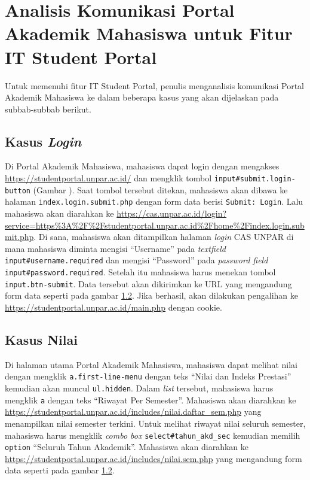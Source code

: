 \section{Analisis Komunikasi Portal Akademik Mahasiswa untuk Fitur IT Student Portal}
Untuk memenuhi fitur IT Student Portal, penulis menganalisis komunikasi Portal Akademik Mahasiswa ke dalam beberapa kasus yang akan dijelaskan pada subbab-subbab berikut.

\subsection{Kasus \textit{Login}}
Di Portal Akademik Mahasiswa, mahasiswa dapat login dengan mengakses \url{https://studentportal.unpar.ac.id/} dan mengklik tombol \texttt{input\#submit.login-button} (Gambar ). Saat tombol tersebut ditekan, mahasiswa akan dibawa ke halaman \texttt{index.login.submit.php} dengan form data berisi \texttt{Submit: Login}. Lalu mahasiswa akan diarahkan ke \url{https://cas.unpar.ac.id/login?service=https\%3A\%2F\%2Fstudentportal.unpar.ac.id\%2Fhome\%2Findex.login.submit.php}. Di sana, mahasiswa akan ditampilkan halaman \textit{login} CAS UNPAR di mana mahasiswa diminta mengisi ``Username'' pada \textit{textfield} \texttt{input\#username.required} dan mengisi ``Password'' pada \textit{password field} \texttt{input\#password.required}. Setelah itu mahasiswa harus menekan tombol \texttt{input.btn-submit}. Data tersebut akan dikirimkan ke URL \url{} yang mengandung form data seperti pada gambar \ref{}. Jika berhasil, akan dilakukan pengalihan ke \url{https://studentportal.unpar.ac.id/main.php} dengan cookie.

\subsection{Kasus Nilai}
Di halaman utama Portal Akademik Mahasiswa, mahasiswa dapat melihat nilai dengan mengklik \texttt{a.first-line-menu} dengan teks ``Nilai dan Indeks Prestasi'' kemudian akan muncul \texttt{ul.hidden}. Dalam \textit{list} tersebut, mahasiswa harus mengklik \texttt{a} dengan teks ``Riwayat Per Semester''. Mahasiswa akan diarahkan ke \url{https://studentportal.unpar.ac.id/includes/nilai.daftar_sem.php} yang menampilkan nilai semester terkini. Untuk melihat riwayat nilai seluruh semester, mahasiswa harus mengklik \textit{combo box} \texttt{select\#tahun\_akd\_sec} kemudian memilih \texttt{option} ``Seluruh Tahun Akademik''. Mahasiswa akan diarahkan ke \url{https://studentportal.unpar.ac.id/includes/nilai.sem.php} yang mengandung form data seperti pada gambar \ref{}.

